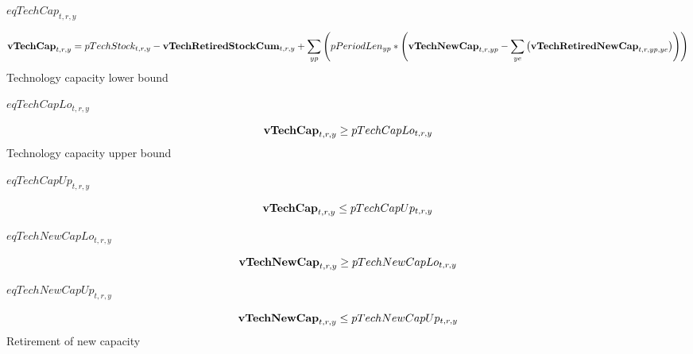 \documentclass{article}
\begin{document}
$eqTechCap_{t,r,y}$





\begin{dmath}
{\bf vTechCap}_{t,r,y}  =  pTechStock_{t,r,y}-{\bf vTechRetiredStockCum}_{t,r,y}+\sum_{yp}{\left(pPeriodLen_{yp}*\left({\bf vTechNewCap}_{t,r,yp}-\sum_{ye}{\left({\bf vTechRetiredNewCap}_{t,r,yp,ye}\right)}\right)\right)}
\end{dmath}
Technology capacity lower bound







$eqTechCapLo_{t,r,y}$





\begin{dmath}
{\bf vTechCap}_{t,r,y}  \ge  pTechCapLo_{t,r,y}
\end{dmath}
Technology capacity upper bound







$eqTechCapUp_{t,r,y}$





\begin{dmath}
{\bf vTechCap}_{t,r,y}  \le  pTechCapUp_{t,r,y}
\end{dmath}








$eqTechNewCapLo_{t,r,y}$





\begin{dmath}
{\bf vTechNewCap}_{t,r,y}  \ge  pTechNewCapLo_{t,r,y}
\end{dmath}








$eqTechNewCapUp_{t,r,y}$





\begin{dmath}
{\bf vTechNewCap}_{t,r,y}  \le  pTechNewCapUp_{t,r,y}
\end{dmath}
Retirement of new capacity
\end{document}
